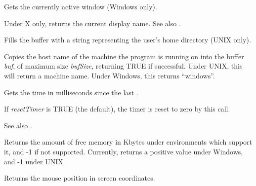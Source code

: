 \label{wxgetactivewindow}


Gets the currently active window (Windows only).

\label{wxgetdisplayname}


Under X only, returns the current display name. See also .



Fills the buffer with a string representing the user's home directory (UNIX only).



Copies the host name of the machine the program is running on into the
buffer {\it buf}, of maximum size {\it bufSize}, returning TRUE if
successful. Under UNIX, this will return a machine name. Under Windows,
this returns ``windows''.

\label{wxgetelapsedtime}


Gets the time in milliseconds since the last .

If {\it resetTimer} is TRUE (the default), the timer is reset to zero
by this call.

See also .



Returns the amount of free memory in Kbytes under environments which
support it, and -1 if not supported. Currently, returns a positive value
under Windows, and -1 under UNIX.



Returns the mouse position in screen coordinates.


